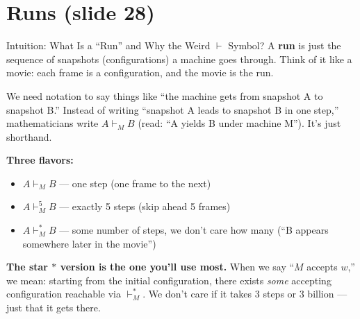 \documentclass[11pt,a4paper]{article}
\begin{document}
\newpage
\section{Runs (slide 28)}

\begin{conceptbox}{Intuition: What Is a ``Run'' and Why the Weird $\vdash$ Symbol?}
A \textbf{run} is just the sequence of snapshots (configurations) a machine goes through. Think of it like a movie: each frame is a configuration, and the movie is the run.

We need notation to say things like ``the machine gets from snapshot A to snapshot B.'' Instead of writing ``snapshot A leads to snapshot B in one step,'' mathematicians write $A \vdash_M B$ (read: ``A yields B under machine M''). It's just shorthand.

\textbf{Three flavors:}
\begin{itemize}[nosep]
\item $A \vdash_M B$ --- one step (one frame to the next)
\item $A \vdash_M^5 B$ --- exactly 5 steps (skip ahead 5 frames)
\item $A \vdash_M^* B$ --- some number of steps, we don't care how many (``B appears somewhere later in the movie'')
\end{itemize}

\textbf{The star $*$ version is the one you'll use most.} When we say ``$M$ accepts $w$,'' we mean: starting from the initial configuration, there exists \textit{some} accepting configuration reachable via $\vdash_M^*$. We don't care if it takes 3 steps or 3 billion --- just that it gets there.
\end{conceptbox}
\end{document}
